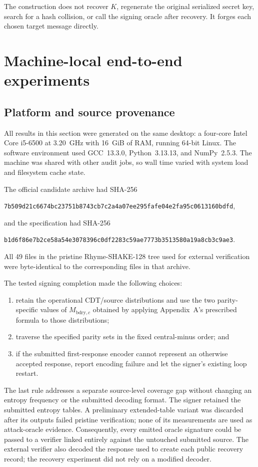 \documentclass[11pt,a4paper]{article}
\begin{document}
The construction does not recover $K$, regenerate the original serialized
secret key, search for a hash collision, or call the signing oracle after
recovery.  It forges each chosen target message directly.

\section{Machine-local end-to-end experiments}
\label{sec:experiment}

\subsection{Platform and source provenance}

All results in this section were generated on the same desktop: a four-core
Intel Core i5-6500 at 3.20~GHz with 16~GiB of RAM, running 64-bit Linux.  The
software environment used GCC~13.3.0, Python~3.13.13, and NumPy~2.5.3.  The
machine was shared with other audit jobs, so wall time varied with system load
and filesystem cache state.

The official candidate archive had SHA-256
\begin{center}
\small\texttt{7b509d21c6674bc23751b8743cb7c2a4a07ee295fafe04e2fa95c0613160bdfd},
\end{center}
and the specification had SHA-256
\begin{center}
\small\texttt{b1d6f86e7b2ce58a54e3078396c0df2283c59ae7773b3513580a19a8cb3c9ae3}.
\end{center}
All 49 files in the pristine Rhyme-SHAKE-128 tree used for external
verification were byte-identical to the corresponding files in that archive.

The tested signing completion made the following choices:
\begin{enumerate}[leftmargin=1.7em]
  \item retain the operational CDT/source distributions and use the two
        parity-specific values of $M_{\mathrm{bdry},c}$ obtained by applying
        Appendix~A's prescribed formula to those distributions;
  \item traverse the specified parity sets in the fixed central-minus order;
        and
  \item if the submitted first-response encoder cannot represent an otherwise
        accepted response, report encoding failure and let the signer's
        existing loop restart.
\end{enumerate}
The last rule addresses a separate source-level coverage gap without changing
an entropy frequency or the submitted decoding format.  The signer retained
the submitted entropy tables.  A preliminary extended-table variant was
discarded after its outputs failed pristine verification; none of its
measurements are used as attack-oracle evidence.  Consequently, every emitted oracle signature
could be passed to a verifier linked entirely against the untouched submitted
source.  The external verifier also decoded the response used to create each
public recovery record; the recovery experiment did not rely on a modified
decoder.
\end{document}
